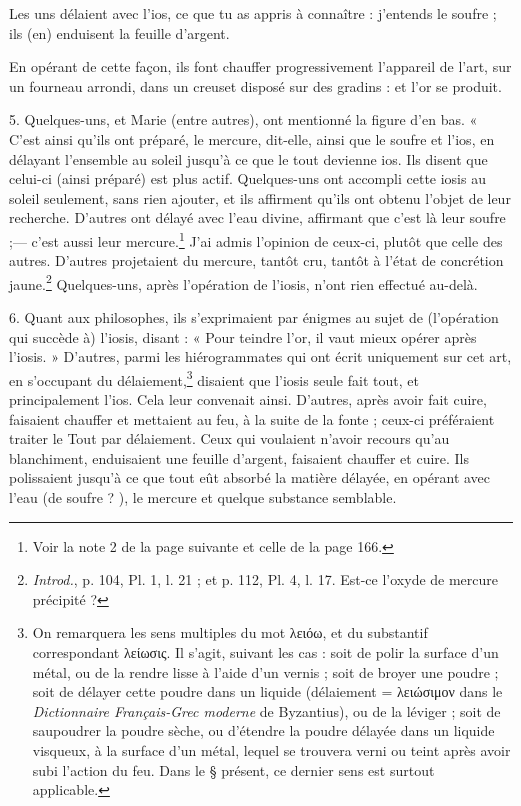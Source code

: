 \documentclass[landscape, a4paper, 11pt, oneside, polutonikogreek, french]{article}
\begin{document}
Les uns délaient avec l'ios, ce que tu as appris à connaître : j'entends le soufre ; ils (en) enduisent la feuille d'argent.

En opérant de cette façon, ils font chauffer progressivement l'appareil de l'art, sur un fourneau arrondi, dans un creuset disposé sur des gradins : et l'or se produit.

5. Quelques-uns, et Marie (entre autres), ont mentionné la figure d'en bas. « C'est ainsi qu'ils ont préparé, le mercure, dit-elle, ainsi que le soufre et l'ios, en délayant l'ensemble au soleil jusqu'à ce que le tout devienne ios. Ils disent que celui-ci (ainsi préparé) est plus actif. Quelques-uns ont accompli cette iosis au soleil seulement, sans rien ajouter, et ils affirment qu'ils ont obtenu l'objet de leur recherche. D'autres ont délayé avec l'eau divine, affirmant que c'est là leur soufre ;--- c'est aussi leur mercure.\footnote{Voir la note 2 de la page suivante et celle de la page 166.} J'ai admis l'opinion de ceux-ci, plutôt que celle des autres. D'autres projetaient du mercure, tantôt cru, tantôt à l'état de concrétion jaune.\footnote{\emph{Introd.}, p. 104, Pl. 1, l. 21 ; et p. 112, Pl. 4, l. 17. Est-ce l'oxyde de mercure précipité ?} Quelques-uns, après l'opération de l'iosis, n'ont rien effectué au-delà.

6. Quant aux philosophes, ils s'exprimaient par énigmes au sujet de (l'opération qui succède à) l'iosis, disant : « Pour teindre l'or, il vaut mieux opérer après l'iosis. » D'autres, parmi les hiérogrammates qui ont écrit uniquement sur cet art, en s'occupant du délaiement,\footnote{On remarquera les sens multiples du mot λειόω, et du substantif correspondant λείωσις. Il s'agit, suivant les cas : soit de polir la surface d'un métal, ou de la rendre lisse à l'aide d'un vernis ; soit de broyer une poudre ; soit de délayer cette poudre dans un liquide (délaiement = λειώσιμον dans le \emph{Dictionnaire Français-Grec moderne} de Byzantius), ou de la léviger ; soit de saupoudrer la poudre sèche, ou d'étendre la poudre délayée dans un liquide visqueux, à la surface d'un métal, lequel se trouvera verni ou teint après avoir subi l'action du feu. Dans le § présent, ce dernier sens est surtout applicable.} disaient que l'iosis seule fait tout, et principalement l'ios. Cela leur convenait ainsi. D'autres, après avoir fait cuire, faisaient chauffer et mettaient au feu, à la suite de la fonte ; ceux-ci préféraient traiter le Tout par délaiement. Ceux qui voulaient n'avoir recours qu'au blanchiment, enduisaient une feuille d'argent, faisaient chauffer et cuire. Ils polissaient jusqu'à ce que tout eût absorbé la matière délayée, en opérant avec l'eau (de soufre ? ), le mercure et quelque substance semblable.
\end{document}
